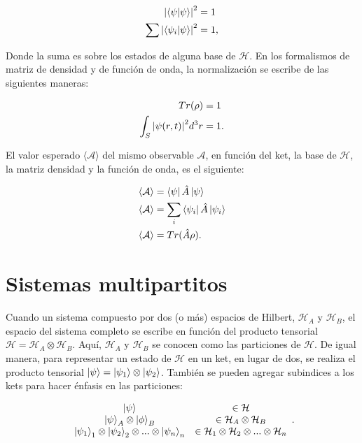 \begin{align}
    \abs{\braket{\psi}}^2 &= 1 \\
    \sum\limits \abs{\braket{\psi_i}{\psi}}^2 &= 1 ,
\end{align}

Donde la suma es sobre los estados de alguna base de $\mathcal{H}$. En los formalismos de matriz de densidad y de función de onda, la normalización se escribe de las siguientes maneras:

\begin{align}
    Tr(\rho) &= 1 \\
    \int_S \abs{\psi(r,t)}^2 d^3 r &= 1 .
\end{align}

El valor esperado $\langle \mathcal{A} \rangle$ del mismo observable $\mathcal{A}$, en función del ket, la base de $\mathcal{H}$, la matriz densidad y la función de onda, es el siguiente:

\begin{align}
    \langle \mathcal{A} \rangle &= \bra{\psi} \hat{A} \ket{\psi} \\
    \langle \mathcal{A} \rangle &= \sum\limits_i \bra{\psi_i} \hat{A} \ket{\psi_i} \\
    \langle \mathcal{A} \rangle &= Tr(\hat{A} \rho) .
\end{align}

\section{Sistemas multipartitos}

Cuando un sistema compuesto por dos (o más) espacios de Hilbert, $\mathcal{H}_A$ y $\mathcal{H}_B$, el espacio del sistema completo se escribe en función del producto tensorial $\mathcal{H} = \mathcal{H}_A \otimes \mathcal{H}_B$. Aquí, $\mathcal{H}_A$ y $\mathcal{H}_B$ se conocen como las particiones de $\mathcal{H}$. De igual manera, para representar un estado de $\mathcal{H}$ en un ket, en lugar de dos, se realiza el producto tensorial $\ket{\psi} = \ket{\psi_1} \otimes \ket{\psi_2}$. También se pueden agregar subindices a los kets para hacer énfasis en las particiones:

\begin{equation}
    \begin{array}{c c}
        \ket{\psi} & \in \mathcal{H} \\
        \ket{\psi}_A \otimes \ket{\phi}_B & \in \mathcal{H}_A \otimes \mathcal{H}_B \\
        \ket{\psi_1}_1 \otimes \ket{\psi_2}_2 \otimes ... \otimes \ket{\psi_n}_n & \in \mathcal{H}_1 \otimes \mathcal{H}_2 \otimes ... \otimes \mathcal{H}_n
    \end{array} .
\end{equation}

